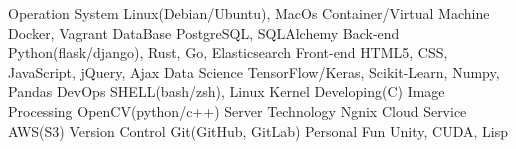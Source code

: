\begin{cvhonors}
  	\cvhonor
    	{Operation System}
	{Linux(Debian/Ubuntu), MacOs}
    	{}
    	{}
	\cvhonor
	{Container/Virtual Machine}
	{Docker, Vagrant}
	{}
	{}
	\cvhonor
    	{DataBase}
    	{PostgreSQL, SQLAlchemy}
    	{}
	{}
  	\cvhonor
    	{Back-end}
	{Python(flask/django), Rust, Go, Elasticsearch}
    	{}
    	{}
	\cvhonor
	{Front-end}
	{HTML5, CSS, JavaScript, jQuery, Ajax}
	{}
	{}
  	\cvhonor
    	{Data Science}
	{TensorFlow/Keras, Scikit-Learn, Numpy, Pandas}
    	{}
    	{}
	\cvhonor
	{DevOps}
	{SHELL(bash/zsh), Linux Kernel Developing(C)}
	{}
	{}
	\cvhonor
	{Image Processing}
	{OpenCV(python/c++)}
	{}
	{}
	\cvhonor
	{Server Technology}
	{Ngnix}
	{}
	{}
	\cvhonor
	{Cloud Service}
	{AWS(S3)}
	{}
	{}
	\cvhonor
	{Version Control}
	{Git(GitHub, GitLab)}
	{}
	{}
	\cvhonor
	{Personal Fun}
	{Unity, CUDA, Lisp}
	{}
	{}
\end{cvhonors}

